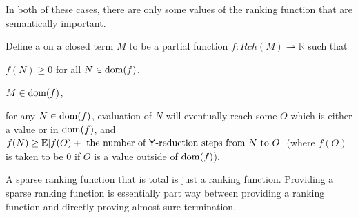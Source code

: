 In both of these cases, there are only some values of the ranking function that are semantically important. 
\begin{definition}\rm
Define a  on a closed term $M$ to be a partial function $f : Rch(M) \rightharpoonup \mathbb R$ such that
\begin{asparaenum}[(i)]
    \item $f(N) \geq 0$ for all $N \in \operatorname{dom}(f)$,
    \item $M \in \operatorname{dom}(f)$,
    \item for any $N \in \operatorname{dom}(f)$, evaluation of $N$ will eventually 
     reach some $O$ which is either a value or in $\operatorname{dom}(f)$, and $f(N) \geq \mathbb E[f(O) + \text{ the number of $\tY$-reduction steps from $N$ to $O$}]$ (where $f(O)$ is taken to be 0 if $O$ is a value outside of $\operatorname{dom}(f)$).
\end{asparaenum}

\iffalse
\begin{itemize}
    \item $f(N) \geq 0$ for all $N$ where $f$ is defined.
    \item $f$ is defined at $M$.
    \item For any $N$ in the domain of definition of $f$, evaluation of $N$ will eventually 
     reach some $O$ which is either a value or in the domain of definition of $f$, and $f(N) \geq \mathbb E[f(O) + \text{ the number of $\tY$-reduction steps from $N$ to $O$}]$ (where $f(O)$ is taken to be 0 if $O$ is a value outside of the domain of $f$).
\end{itemize}
\fi
\end{definition}
A sparse ranking function that is total is just a ranking function. Providing a sparse ranking function is essentially part way between providing a ranking function and directly proving almost sure termination.

